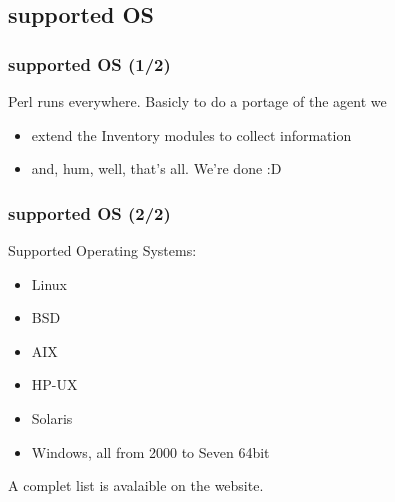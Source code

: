 \subsection{supported OS}
\begin{frame}
\frametitle{supported OS (1/2)}
Perl runs everywhere.
\pause
Basicly to do a portage of the agent we
\begin{itemize}
%
\item extend the Inventory modules to collect information
\item and, hum, well, that's all. We're done :D
%
\end{itemize}

\end{frame}
\begin{frame}
\frametitle{supported OS (2/2)}
Supported Operating Systems:
\begin{itemize}
%
\item Linux
\pause
\item BSD
\pause
\item AIX
\pause
\item HP-UX
\pause
\item Solaris
\pause
\item Windows, all from 2000 to Seven 64bit
%
\end{itemize}
A complet list is avalaible on the website.
\end{frame}

